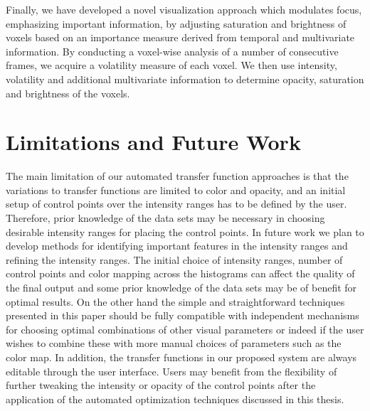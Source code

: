 Finally, we have developed a novel visualization approach which modulates focus, emphasizing important information, by adjusting saturation and brightness of voxels based on an importance measure derived from temporal and multivariate information.
By conducting a voxel-wise analysis of a number of consecutive frames, we acquire a volatility measure of each voxel. We then use intensity, volatility and additional multivariate information to determine opacity, saturation and brightness of the voxels.

\section{Limitations and Future Work}
The main limitation of our automated transfer function approaches is that the variations to transfer functions are limited to color and opacity, and an initial setup of control points over the intensity ranges has to be defined by the user. Therefore, prior knowledge of the data sets may be necessary in choosing desirable intensity ranges for placing the control points. In future work we plan to develop methods for identifying important features in the intensity ranges and refining the intensity ranges.
The initial choice of intensity ranges, number of control points and color mapping across the histograms can affect the quality of the final output and some prior knowledge of the data sets may be of benefit for optimal results. On the other hand the simple and straightforward techniques presented in this paper should be fully compatible with independent mechanisms for choosing optimal combinations of other visual parameters or indeed if the user wishes to combine these with more manual choices of parameters such as the color map.
In addition, the transfer functions in our proposed system are always editable through the user interface. Users may benefit from the flexibility of further tweaking the intensity or opacity of the control points after the application of the automated optimization techniques discussed in this thesis.

